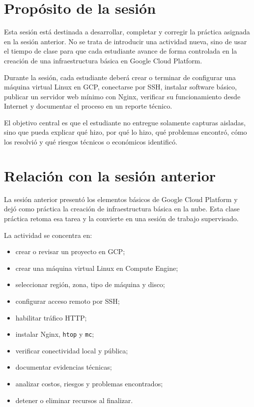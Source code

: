 \documentclass[
  coursetitle={Cómputo Nube y Tecnologías Emergentes},
  coursehours={96},
  coursedate={Verano 2026},
  doctype={Práctica},
  otherlangs={english,french},
  authorname={Lázaro},
  authorsurname={Bustio-Martínez},
  authortitle={PhD},
  role={Profesor Investigador},
  email={lbustio@inaoe.mx},
  phone={5559504000},
  ext={7459},
  institution={Instituto Nacional de Astrofísica, Óptica y Electrónica (INAOE)},
  department={Maestría en Ciencias en Tecnologías de Seguridad},
  address={Luis Enrique Erro 1, Sta. Ma. Tonantzintla, San Andrés Cholula, CP 72840, Puebla, México},
  margin={0.5in}
]{../../lbustio_lecture_notes}
\begin{document}
\IberoCover

\section{Propósito de la sesión}

Esta sesión está destinada a desarrollar, completar y corregir la práctica asignada en la sesión anterior. No se trata de introducir una actividad nueva, sino de usar el tiempo de clase para que cada estudiante avance de forma controlada en la creación de una infraestructura básica en Google Cloud Platform.

Durante la sesión, cada estudiante deberá crear o terminar de configurar una máquina virtual Linux en GCP, conectarse por SSH, instalar software básico, publicar un servidor web mínimo con Nginx, verificar su funcionamiento desde Internet y documentar el proceso en un reporte técnico.

El objetivo central es que el estudiante no entregue solamente capturas aisladas, sino que pueda explicar qué hizo, por qué lo hizo, qué problemas encontró, cómo los resolvió y qué riesgos técnicos o económicos identificó.

\section{Relación con la sesión anterior}

La sesión anterior presentó los elementos básicos de Google Cloud Platform y dejó como práctica la creación de infraestructura básica en la nube. Esta clase práctica retoma esa tarea y la convierte en una sesión de trabajo supervisado.

La actividad se concentra en:

\begin{itemize}
    \item crear o revisar un proyecto en GCP;
    \item crear una máquina virtual Linux en Compute Engine;
    \item seleccionar región, zona, tipo de máquina y disco;
    \item configurar acceso remoto por SSH;
    \item habilitar tráfico HTTP;
    \item instalar Nginx, \texttt{htop} y \texttt{mc};
    \item verificar conectividad local y pública;
    \item documentar evidencias técnicas;
    \item analizar costos, riesgos y problemas encontrados;
    \item detener o eliminar recursos al finalizar.
\end{itemize}
\end{document}
